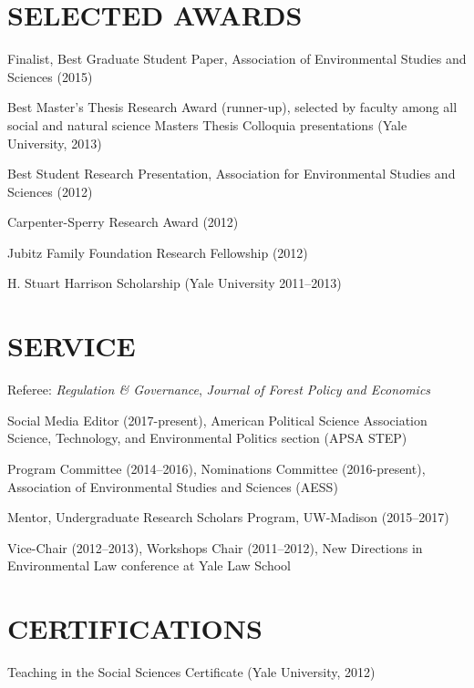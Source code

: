 \documentclass[11pt,]{article}
\begin{document}
\hypertarget{selected-awards}{%
\section{SELECTED AWARDS}\label{selected-awards}}

Finalist, Best Graduate Student Paper, Association of Environmental
Studies and Sciences (2015)

Best Master's Thesis Research Award (runner-up), selected by faculty
among all social and natural science Masters Thesis Colloquia
presentations (Yale University, 2013)

Best Student Research Presentation, Association for Environmental
Studies and Sciences (2012)

Carpenter-Sperry Research Award (2012)

Jubitz Family Foundation Research Fellowship (2012)

H. Stuart Harrison Scholarship (Yale University 2011--2013)

\hypertarget{service}{%
\section{SERVICE}\label{service}}

Referee: \emph{Regulation \& Governance}, \emph{Journal of Forest Policy
and Economics}

Social Media Editor (2017-present), American Political Science
Association Science, Technology, and Environmental Politics section
(APSA STEP)

Program Committee (2014--2016), Nominations Committee (2016-present),
Association of Environmental Studies and Sciences (AESS)

Mentor, Undergraduate Research Scholars Program, UW-Madison (2015--2017)

Vice-Chair (2012--2013), Workshops Chair (2011--2012), New Directions in
Environmental Law conference at Yale Law School

\hypertarget{certifications}{%
\section{CERTIFICATIONS}\label{certifications}}

Teaching in the Social Sciences Certificate (Yale University, 2012)
\end{document}

